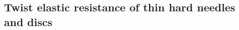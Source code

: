 

\begin{subappendices}
\section[Twist elastic resistance]{Twist elastic resistance of thin hard needles and discs}


\end{subappendices}
